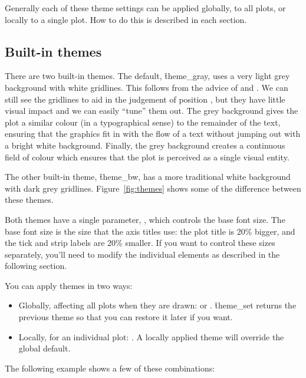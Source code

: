 \noindent Generally each of these theme settings can be applied globally, to all plots, or locally to a single plot.  How to do this is described in each section.

\subsection{Built-in themes}
\label{sec:built_in}

There are two built-in themes.  The default, \f{theme_gray}, uses a very light grey background with white gridlines.  This follows from the advice of \citet{tufte:2006,tufte:1990,tufte:2001,tufte:1997} and \citet{brewer:1994,carr:2002,carr:1994,carr:1999}. We can still see the gridlines to aid in the judgement of position \citep{cleveland:1993a}, but they have little visual impact and we can easily ``tune'' them out. The grey background gives the plot a similar colour (in a typographical sense) to the remainder of the text, ensuring that the graphics fit in with the flow of a text without jumping out with a bright white background. Finally, the grey background creates a continuous field of colour which ensures that the plot is perceived as a single visual entity. 

The other built-in theme, \f{theme_bw}, has a more traditional white background with dark grey gridlines.  Figure~\ref{fig:themes} shows some of the difference between these themes.

Both themes have a single parameter, , which controls the base font size.  The base font size is the size that the axis titles use: the plot title is 20\% bigger, and the tick and strip labels are 20\% smaller.  If you want to control these sizes separately, you'll need to modify the individual elements as described in the following section.

You can apply themes in two ways:

\begin{itemize}
  \item Globally, affecting all plots when they are drawn:  or .  \f{theme_set} returns the previous theme so that you can restore it later if you want.
  
  \item Locally, for an individual plot:  .  A locally applied theme will override the global default.
\end{itemize}

\noindent The following example shows a few of these combinations:

